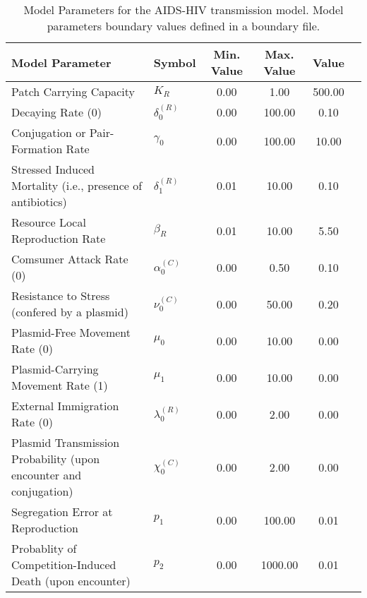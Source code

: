 \begin{table}
\centering
\begin{tabular}{p{5cm}lcccc}
{\bf Model Parameter} & {\bf Symbol} & {\bf Min. Value} & {\bf Max. Value} & {\bf Value}\\
\hline\hline
Patch Carrying Capacity & $K_R$ & 0.00 & 1.00 & 500.00\\
Decaying Rate (0) & $\delta^{(R)}_0$ & 0.00 & 100.00 & 0.10\\
Conjugation or Pair-Formation Rate & $\gamma_0$ & 0.00 & 100.00 & 10.00\\
Stressed Induced Mortality (i.e., presence of antibiotics) & $\delta^{(R)}_1$ & 0.01 & 10.00 & 0.10\\
Resource Local Reproduction Rate & $\beta_R$ & 0.01 & 10.00 & 5.50\\
Comsumer Attack Rate (0) & $\alpha^{(C)}_0$ & 0.00 & 0.50 & 0.10\\
Resistance to Stress (confered by a plasmid) & $\nu^{(C)}_0$ & 0.00 & 50.00 & 0.20\\
Plasmid-Free Movement Rate (0) & $\mu_0$ & 0.00 & 10.00 & 0.00\\
Plasmid-Carrying Movement Rate (1) & $\mu_1$ & 0.00 & 10.00 & 0.00\\
External Immigration Rate (0) & $\lambda^{(R)}_0$ & 0.00 & 2.00 & 0.00\\
Plasmid Transmission Probability (upon encounter and conjugation) & $\chi^{(C)}_0$ & 0.00 & 2.00 & 0.00\\
Segregation Error at Reproduction & $p_1$ & 0.00 & 100.00 & 0.01\\
Probablity of Competition-Induced Death (upon encounter) & $p_2$ & 0.00 & 1000.00 & 0.01\\
\hline\hline
\end{tabular}
\caption{Model Parameters for the AIDS-HIV transmission model. Model parameters boundary values defined in a boundary file.}
\end{table}
